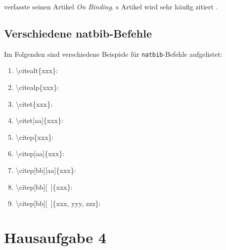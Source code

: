 \documentclass[10pt,paper=a4,abstracton]{scrartcl}
\begin{document}
\citeauthor{Chomsky80a} verfasste \citeyear{Chomsky80a} seinen Artikel \emph{On Binding}. \citeauthor{Chomsky80a}s Artikel wird sehr häufig zitiert \citep[vgl.][]{Heim&Kratzer00a}.


\subsection{Verschiedene natbib-Befehle}

Im Folgenden sind verschiedene Beispiele für \texttt{natbib}-Befehle aufgelistet:

\begin{enumerate}
	\item \textbackslash citealt\{xxx\}: \citealt{Heim&Kratzer00a}
	
	\item \textbackslash citealp\{xxx\}: \citealp{Heim01a}
	
	\item \textbackslash citet\{xxx\}: \citet{Winter97a}  
	
	\item \textbackslash citet[aa]\{xxx\}: \citet[36]{Champollion14a}
	
	\item \textbackslash citep\{xxx\}: \citep{Krifka89a}
	
	\item \textbackslash citep[aa]\{xxx\}: \citep[42]{MyP17c} 
	
	\item \textbackslash citep[bb][aa]\{xxx\}: \citep[vgl.][36]{Nolda&Co14a}
	
	\item \textbackslash citep[bb][~]\{xxx\}: \citep[vgl.][]{Heusinger&Co11a} 
	
	\item \textbackslash citep[bb][~]\{xxx, yyy, zzz\}: \citep[vgl.][]{Heim01a,Winter97a,Krifka89a}
\end{enumerate}


\section{Hausaufgabe 4}







%
%



\end{document}
